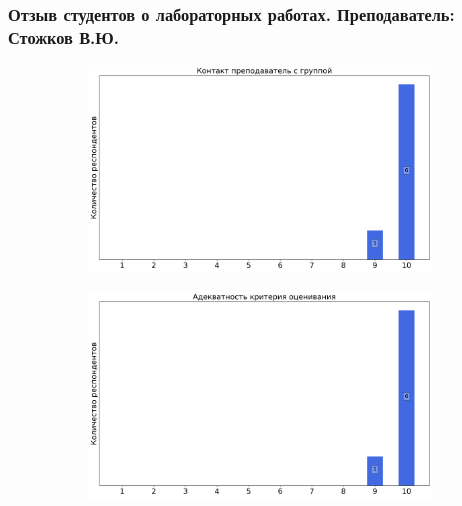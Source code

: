         
        \subsubsection{Отзыв студентов о лабораторных работах. Преподаватель: Стожков В.Ю.}
            \begin{figure}[H]
                \centering
                \begin{subfigure}[b]{0.45\textwidth}
                    \centering
                    \includegraphics[width=\textwidth]{images/3 course/Общая физика - квантовая физика/labniks-marks-Стожков В.Ю.-0.png}
                \end{subfigure}
                \begin{subfigure}[b]{0.45\textwidth}
                    \centering
                    \includegraphics[width=\textwidth]{images/3 course/Общая физика - квантовая физика/labniks-marks-Стожков В.Ю.-1.png}
                \end{subfigure}
                \begin{subfigure}[b]{0.45\textwidth}

\end{subfigure}
\end{figure}
